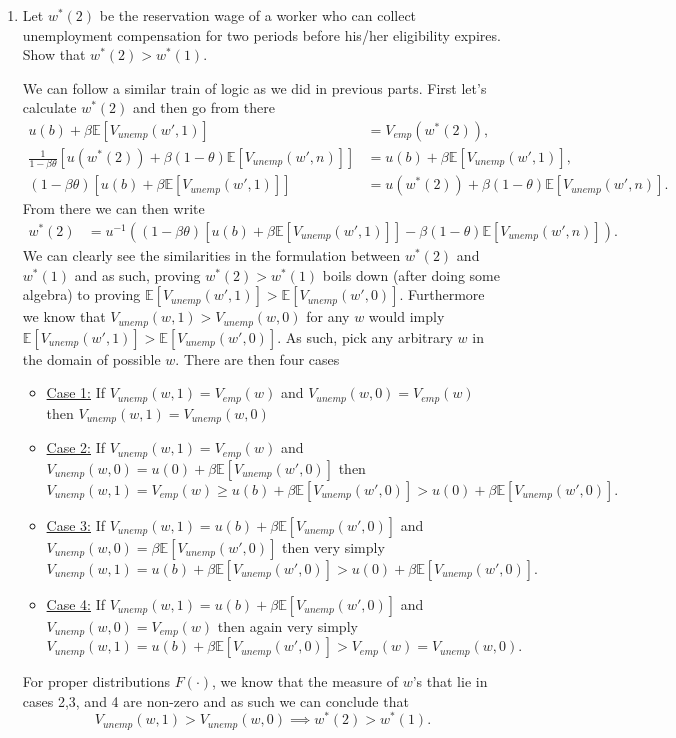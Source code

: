 \documentclass[11pt,english]{article}
\begin{document}
\begin{enumerate}
 \item Let $w^*(2)$ be the reservation wage of a worker who can collect
 unemployment compensation for two periods before his/her eligibility
 expires. Show that $w^*(2) > w^*(1)$.
 \begin{solution}
 We can follow a similar train of logic as we did in previous parts. First let's calculate $w^*(2)$ and then go from there
\begin{align*}
u(b) + \beta\mathbb{E}[V_{unemp}(w', 1)] &= V_{emp}(w^*(2)),\\
 \frac{1}{1 - \beta \theta}\left[u(w^*(2)) + \beta (1 -\theta)\mathbb{E}[V_{unemp}(w',n)]\right] &= u(b) + \beta \mathbb{E}\left[V_{unemp}(w',1)\right],\\
(1 - \beta \theta) \left[u(b) + \beta \mathbb{E}\left[V_{unemp}(w',1)\right]\right] &= u(w^*(2)) + \beta (1 -\theta)\mathbb{E}[V_{unemp}(w',n)].
\end{align*} From there we can then write
\begin{align*}
w^*(2) &= u^{-1}\left((1 - \beta \theta) \left[u(b) + \beta \mathbb{E}\left[V_{unemp}(w',1)\right]\right] - \beta (1 -\theta)\mathbb{E}[V_{unemp}(w',n)]\right).
\end{align*}We can clearly see the similarities in the formulation between $w^*(2)$ and $w^*(1)$ and as such, proving $w^*(2) > w^*(1)$ boils down (after doing some algebra) to proving $\mathbb{E}[V_{unemp}(w',1)] > \mathbb{E}[V_{unemp}(w',0)]$. Furthermore we know that $V_{unemp}(w,1) > V_{unemp}(w,0)$ for any $w$ would imply $\mathbb{E}[V_{unemp}(w',1)] > \mathbb{E}[V_{unemp}(w',0)]$. As such, pick any arbitrary $w$ in the domain of possible $w$. There are then four cases
\begin{itemize}
\item \underline{Case 1:} If $V_{unemp}(w, 1) = V_{emp}(w)$ and $V_{unemp}(w, 0) = V_{emp}(w)$ then $V_{unemp}(w, 1) = V_{unemp}(w, 0)$
\item \underline{Case 2:} If $V_{unemp}(w, 1) = V_{emp}(w)$ and $V_{unemp}(w, 0) = u(0) + \beta \mathbb{E}[V_{unemp}(w', 0)]$ then $$V_{unemp}(w,1) = V_{emp}(w) \geq u(b) +  \beta \mathbb{E}[V_{unemp}(w', 0)] > u(0) + \beta \mathbb{E}[V_{unemp}(w', 0)].$$
\item \underline{Case 3:} If $V_{unemp}(w,1) =  u(b) +  \beta \mathbb{E}[V_{unemp}(w', 0)]$ and $V_{unemp}(w, 0) = \beta \mathbb{E}[V_{unemp}(w', 0)]$ then very simply $$V_{unemp}(w,1) = u(b) +  \beta \mathbb{E}[V_{unemp}(w', 0)] > u(0) + \beta \mathbb{E}[V_{unemp}(w', 0)].$$
\item \underline{Case 4:} If $V_{unemp}(w,1) =  u(b) +  \beta \mathbb{E}[V_{unemp}(w', 0)]$ and $V_{unemp}(w, 0) = V_{emp}(w)$ then again very simply  $$V_{unemp}(w,1) = u(b) +  \beta \mathbb{E}[V_{unemp}(w', 0)] >  V_{emp}(w) = V_{unemp}(w, 0).$$
\end{itemize}
For proper distributions $F(\cdot)$, we know that the measure of $w$'s that lie in cases 2,3, and 4 are non-zero and as such we can conclude that $$V_{unemp}(w,1) > V_{unemp}(w,0) \implies w^*(2) > w^*(1).$$
 \end{solution}
 

\end{enumerate}
\end{document}
